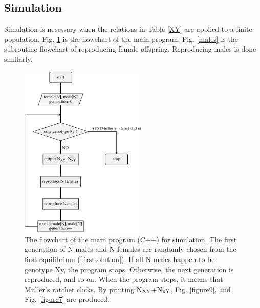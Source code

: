 \documentclass[referee,sn-basic]{sn-jnl}%
\theoremstyle{thmstyleone}%
\theoremstyle{thmstyletwo}%
\theoremstyle{thmstylethree}%
\begin{document}
\begin{appendices}
\section{Simulation}
Simulation is necessary when the relations in Table \ref{XY} are applied to a finite population.
Fig. \ref{flowchart} is the flowchart of the main program.
Fig. \ref{males} is the subroutine flowchart of reproducing female offspring. Reproducing males is done similarly.

\begin{figure}
\includegraphics[width=6cm]{FigA1.eps} 
\caption{ 
The flowchart of the main program (C++) for simulation. The first generation of N males and N females are randomly chosen from the first equilibrium (\ref{firstsolution}). If all N males happen to be genotype Xy, the program stops. Otherwise, the next generation is reproduced, and so on. When the program stops, it means that Muller's ratchet clicks.
By printing N$_{\rm XY}$+N$_{\rm xY}$, Fig. \ref{figure9}, and Fig. \ref{figure7} are produced. 
}\label{flowchart}
\end{figure}


\end{appendices}
\end{document}
